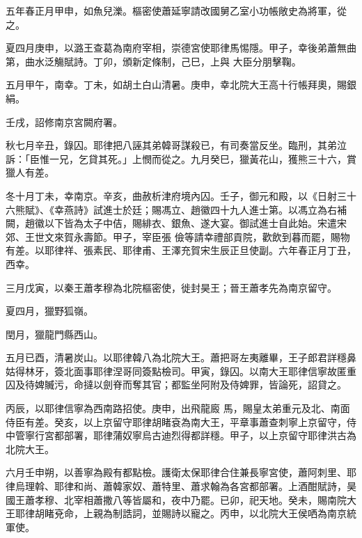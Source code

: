 \begin{pinyinscope}
 五年春正月甲申，如魚兒濼。樞密使蕭延寧請改國舅乙室小功帳敞史為將軍，從之。



 夏四月庚申，以潞王查葛為南府宰相，崇德宮使耶律馬惕隱。甲子，幸後弟蕭無曲第，曲水泛觴賦詩。丁卯，頒新定條制，己巳，上與
 大臣分朋擊鞠。



 五月甲午，南幸。丁未，如胡土白山清暑。庚申，幸北院大王高十行帳拜奧，賜銀絹。



 壬戌，詔修南京宮闕府署。



 秋七月辛丑，錄囚。耶律把八誣其弟韓哥謀殺已，有司奏當反坐。臨刑，其弟泣訴：「臣惟一兄，乞貸其死。」上憫而從之。九月癸巳，獵黃花山，獲熊三十六，賞獵人有差。



 冬十月丁未，幸南京。辛亥，曲赦析津府境內囚。壬子，御元和殿，以《日射三十六熊賦》、《幸燕詩》試進士於廷；賜馮立、趙徽四十九人進士第。以馮立為右補闕，趙徽以下皆為太子中佶，賜緋衣、銀魚、遂大宴。御試進士自此始。宋遣宋郊、王世文來賀永壽節。甲子，宰臣張
 儉等請幸禮部貢院，歡飲到暮而罷，賜物有差。以耶律祥、張素民、耶律甫、王澤充賀宋生辰正旦使副。六年春正月丁丑，西幸。



 三月戊寅，以秦王蕭孝穆為北院樞密使，徙封昊王；晉王蕭孝先為南京留守。



 夏四月，獵野狐嶺。



 閏月，獵龍門縣西山。



 五月已酉，清暑炭山。以耶律韓八為北院大王。蕭把哥左夷離畢，王子郎君詳穩鼻姑得林牙，簽北面事耶律涅哥同簽點檢司。甲寅，錄囚。以南大王耶律信寧故匿重囚及待婢贓污，命撻以劍脊而奪其官；都監坐阿附及侍婢罪，皆論死，詔貸之。



 丙辰，以耶律信寧為西南路招使。庚申，出飛龍廄
 馬，賜皇太弟重元及北、南面侍臣有差。癸亥，以上京留守耶律胡睹袞為南大王，平章事蕭查刺寧上京留守，侍中管寧行宮都部署，耶律蒲奴寧烏古迪烈得都詳穩。甲子，以上京留守耶律洪古為北院大王。



 六月壬申朔，以善寧為殿有都點檢。護衛太保耶律合住兼長寧宮使，蕭阿刺里、耶律烏理斡、耶律和尚、蕭韓家奴、蕭特里、蕭求翰為各宮都部署。上酒酣賦詩，昊國王蕭孝穆、北宰相蕭撒八等皆屬和，夜中乃罷。已卯，祀天地。癸未，賜南院大王耶律胡睹兗命，上親為制誥詞，並賜詩以寵之。丙申，以北院大王侯哂為南京統軍使。




\end{pinyinscope}
